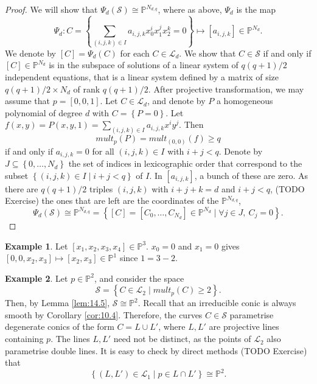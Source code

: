 \documentclass{article}
\renewcommand{\P}{\mathbb{P}}
\newcommand{\rb}[1]{\left( #1 \right)}
\renewcommand{\sb}[1]{\left[ #1 \right]}
\newcommand{\cb}[1]{\left\{ #1 \right\}}
\theoremstyle{definition}\newtheorem{definition}{Definition}[section]
\theoremstyle{definition}\newtheorem{notation}[definition]{Notation}
\theoremstyle{definition}\newtheorem{remark}[definition]{Remark}
\theoremstyle{definition}\newtheorem{example}[definition]{Example}
\theoremstyle{definition}\newtheorem{fact}{Fact}
\theoremstyle{definition}\newtheorem{exercise}{Exercise}
\begin{document}
\begin{proof}
We will show that $ \Psi_d\rb{\mathcal{S}} \cong \P^{N_{d, q}} $, where as above, $ \Psi_d $ is the map
$$ \Psi_d : C = \cb{\sum_{\rb{i, j, k} \in I} a_{i, j, k}x_0^ix_1^jx_2^k = 0} \mapsto \sb{a_{i, j, k}} \in \P^{N_d}. $$
We denote by $ \sb{C} = \Psi_d\rb{C} $ for each $ C \in \mathcal{L}_d $. We show that $ C \in \mathcal{S} $ if and only if $ \sb{C} \in \P^{N_d} $ is in the subspace of solutions of a linear system of $ q\rb{q + 1} / 2 $ independent equations, that is a linear system defined by a matrix of size $ q\rb{q + 1} / 2 \times N_d $ of rank $ q\rb{q + 1} / 2 $. After projective transformation, we may assume that $ p = \sb{0, 0, 1} $. Let $ C \in \mathcal{L}_d $, and denote by $ P $ a homogeneous polynomial of degree $ d $ with $ C = \cb{P = 0} $. Let $ f\rb{x, y} = P\rb{x, y, 1} =  \sum_{\rb{i, j, k} \in I} a_{i, j, k}x^iy^j $. Then
$$ mult_p\rb{P} = mult_{\rb{0, 0}}\rb{f} \ge q $$
if and only if $ a_{i, j, k} = 0 $ for all $ \rb{i, j, k} \in I $ with $ i + j < q $. Denote by $ J \subseteq \cb{0, \dots, N_d} $ the set of indices in lexicographic order that correspond to the subset $ \cb{\rb{i, j, k} \in I \mid i + j < q} $ of $ I $. In $ \sb{a_{i, j, k}} $, a bunch of these are zero. As there are $ q\rb{q + 1} / 2 $ triples $ \rb{i, j, k} $ with $ i + j + k = d $ and $ i + j < q $, (TODO Exercise) the ones that are left are the coordinates of the $ \P^{N_{d, q}} $,
$$ \Psi_d\rb{\mathcal{S}} \cong \P^{N_{d, q}} = \cb{\sb{C} = \sb{C_0, \dots, C_{N_d}} \in \P^{N_d} \mid \forall j \in J, \ C_j = 0}. $$
\end{proof}

\begin{example}
Let $ \sb{x_1, x_2, x_3, x_4} \in \P^3 $. $ x_0 = 0 $ and $ x_1 = 0 $ gives $ \sb{0, 0, x_2, x_3} \mapsto \sb{x_2, x_3} \in \P^1 $ since $ 1 = 3 - 2 $.
\end{example}

\begin{example}
Let $ p \in \P^2 $, and consider the space
$$ \mathcal{S} = \cb{C \in \mathcal{L}_2 \mid mult_p\rb{C} \ge 2}. $$
Then, by Lemma \ref{lem:14.5}, $ \mathcal{S} \cong \P^2 $. Recall that an irreducible conic is always smooth by Corollary \ref{cor:10.4}. Therefore, the curves $ C \in \mathcal{S} $ parametrise degenerate conics of the form $ C = L \cup L' $, where $ L, L' $ are projective lines containing $ p $. The lines $ L, L' $ need not be distinct, as the points of $ \mathcal{L}_2 $ also parametrise double lines. It is easy to check by direct methods (TODO Exercise) that
$$ \cb{\rb{L, L'} \in \mathcal{L}_1 \mid p \in L \cap L'} \cong \P^2. $$
\end{example}
\end{document}

